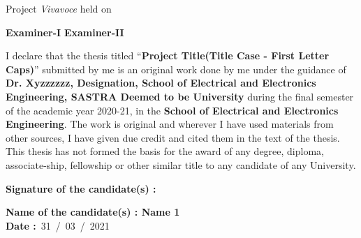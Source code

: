\documentclass[a4paper, 12pt, oneside]{sastra}
\begin{document}
	\vspace*{0.35in}
	
	\noindent Project \textit{Vivavoce} held on
	
	\vspace*{0.50in}
	\noindent \textbf{Examiner-I} \hspace*{120mm} \textbf{Examiner-II}
	
	
	\declaration
	
	
	\begin{doublespace}
		\linespread{2}
		
		I declare that the thesis titled ``\textbf{Project Title(Title Case - First Letter Caps)}'' submitted by me is an original work done by me under the guidance of \textbf{Dr. Xyzzzzzz, Designation, School of Electrical and Electronics Engineering, SASTRA Deemed to be University} during the final semester of the academic year 2020-21, in the \textbf{School of Electrical and Electronics Engineering}. The work is original and wherever I have used materials from other sources, I have given due credit and cited them in the text of the thesis. This thesis has not formed the basis for the award of any degree, diploma, associate-ship, fellowship or other similar title to any candidate of any University.\\
		
	\end{doublespace}
	\noindent\textbf{Signature of the candidate(s)	:}	
	
	\noindent\textbf{Name of the candidate(s)\hspace{7mm}		: Name 1}\\
	
	\noindent\textbf{Date\hspace*{43.5mm}					:}~31~/~03~/~2021\\%
	

	
	\externalcertificate
	
	
	
\end{document}
